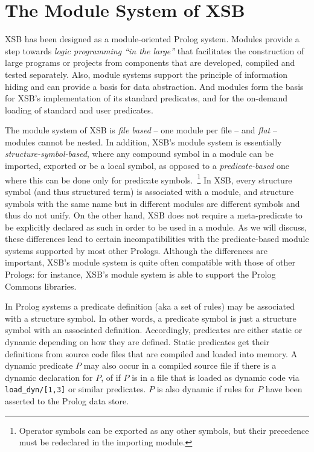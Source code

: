 
\section{The Module System of XSB} \label{Modules}

XSB has been designed as a module-oriented Prolog system.  Modules
provide a step towards {\em logic programming ``in the large''} that
facilitates the construction of large programs or projects from
components that are developed, compiled and tested separately.  Also,
module systems support the principle of information hiding and can
provide a basis for data abstraction.  And modules form the basis for
XSB's implementation of its standard predicates, and for the on-demand
loading of standard and user predicates.

The module system of XSB is {\em file based} -- one module per file --
and {\em flat} -- modules cannot be nested.  In addition, XSB's module
system is essentially {\em structure-symbol-based}, where any compound
symbol in a module can be imported, exported or be a local symbol, as
opposed to a {\em predicate-based} one where this can be done only for
predicate symbols.~\footnote{Operator symbols can be exported as any
  other symbols, but their precedence must be redeclared in the
  importing module.}  In XSB, every structure symbol (and thus
structured term) is associated with a module, and structure symbols
with the same name but in different modules are different symbols and
thus do not unify.  On the other hand, XSB does not require a
meta-predicate to be explicitly declared as such in order to be used
in a module.  As we will discuss, these differences lead to certain
incompatibilities with the predicate-based module systems supported by
most other Prologs.  Although the differences are important, XSB's
module system is quite often compatible with those of other Prologs:
for instance, XSB's module system is able to support the Prolog
Commons libraries.

In Prolog systems a predicate definition (aka a set of rules) may be
associated with a structure symbol.  In other words, a predicate
symbol is just a structure symbol with an associated definition.
Accordingly, predicates are either static or dynamic depending on how
they are defined.  Static predicates get their definitions from source
code files that are compiled and loaded into memory.  A dynamic
predicate $P$ may also occur in a compiled source file if there is a
dynamic declaration for $P$, of if $P$ is in a file that is loaded as
dynamic code via {\tt load\_dyn/[1,3]} or similar predicates.  $P$ is
also dynamic if rules for $P$ have been asserted to the Prolog data
store.

